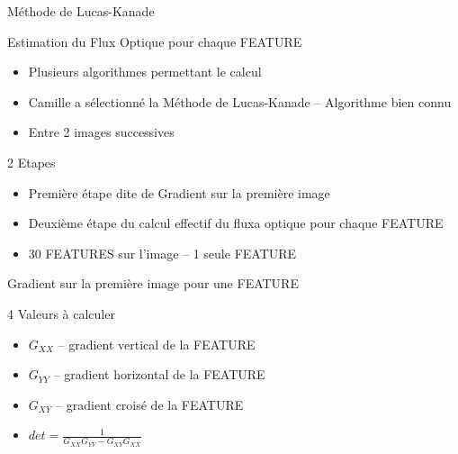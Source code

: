 \documentclass{bredelebeamer}
\begin{document}

\begin{frame}{Méthode de Lucas-Kanade}

\begin{block}{Estimation du Flux Optique pour chaque FEATURE}
\begin{itemize}
	\item Plusieurs algorithmes permettant le calcul
	\item Camille a sélectionné la Méthode de Lucas-Kanade -- Algorithme bien connu
	\item Entre 2 images successives
\end{itemize}
\end{block}

\begin{exampleblock}{2 Etapes}
\begin{itemize}
	\item Première étape dite de Gradient sur la première image
	\item Deuxième étape du calcul effectif du fluxa optique pour chaque FEATURE
	\item 30 FEATURES sur l'image -- 1 seule FEATURE
\end{itemize}
\end{exampleblock}

\end{frame}


\begin{frame}{Gradient sur la première image pour une FEATURE}

	\begin{block}{4 Valeurs à calculer}
\begin{itemize}
	\item $G_{XX}$ -- gradient vertical de la FEATURE
	\item $G_{YY}$ -- gradient horizontal de la FEATURE
	\item $G_{XY}$ -- gradient croisé de la FEATURE
	\item $det = \frac{1}{G_{XX}G_{YY}-G_{XY}G_{XX}}$
\end{itemize}
\end{block}



\end{frame}
\end{document}
